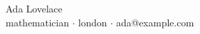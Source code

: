 \begin{center}
{\LARGE Ada Lovelace}\\[0.35em]
{\small mathematician $\cdot$ london $\cdot$ ada@example.com}
\end{center}
